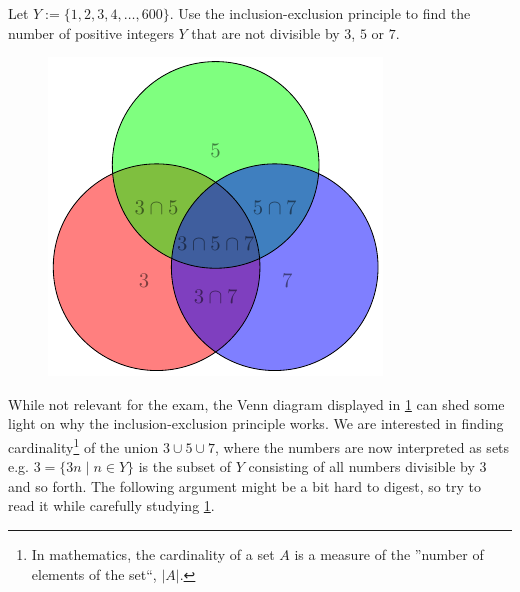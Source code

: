 \documentclass[a4paper, english, 12pt]{article} %
\begin{document}
\titlebox

\begin{problem}[2]
  Let $Y := \{ 1,2,3,4,\ldots,600 \}$. Use the inclusion-exclusion principle to
  find the number of positive integers $Y$ that are not divisible by $3$, $5$ or $7$.
\end{problem}


\begin{answer}
  \begin{figure}[htbp!]
    \centering
    \includegraphics{Venn-Diagram-5}
    \caption{}
    \label{fig:venn}
  \end{figure}
  While not relevant for the exam, the Venn diagram displayed in \cref{fig:venn}
  can shed some light on why the inclusion-exclusion principle works. We are
  interested in finding cardinality\footnote{In mathematics, the cardinality of
    a set $A$ is a measure of the ''number of elements of the set``, $|A|$.} of the union
  $3 \cup 5 \cup 7$, where the numbers are now interpreted as sets e.g. $3 =
  \{3n \mid n \in Y\}$ is the subset of $Y$ consisting of all numbers divisible
  by 3 and so forth. The following argument might be a bit hard to digest, so
  try to read it while carefully studying \cref{fig:venn}.


\end{answer}
\end{document}
